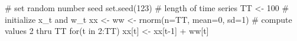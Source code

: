 \begin{Schunk}
\begin{Sinput}
 # set random number seed
 set.seed(123)
 # length of time series
 TT <- 100
 # initialize {x_t} and {w_t}
 xx <- ww <- rnorm(n=TT, mean=0, sd=1)
 # compute values 2 thru TT
 for(t in 2:TT) { xx[t] <- xx[t-1] + ww[t] }
\end{Sinput}
\end{Schunk}
